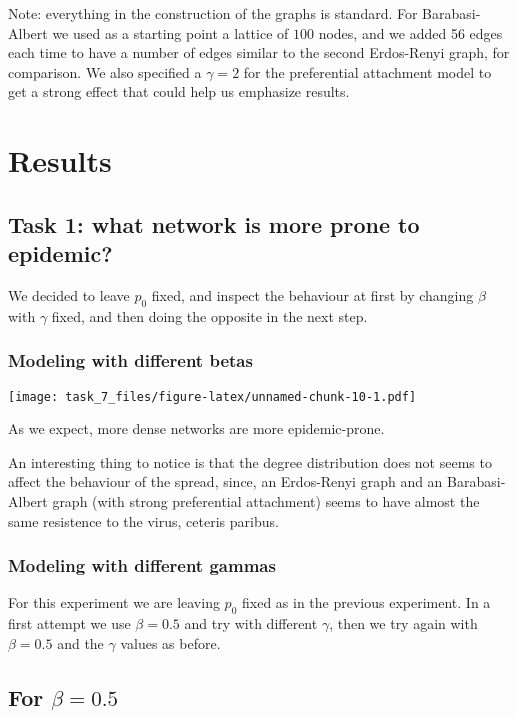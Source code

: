 \documentclass[]{article}
\begin{document}
Note: everything in the construction of the graphs is standard. For
Barabasi-Albert we used as a starting point a lattice of \(100\) nodes,
and we added 56 edges each time to have a number of edges similar to the
second Erdos-Renyi graph, for comparison. We also specified a
\(\gamma = 2\) for the preferential attachment model to get a strong
effect that could help us emphasize results.

\section{Results}\label{results}

\subsection{Task 1: what network is more prone to
epidemic?}\label{task-1-what-network-is-more-prone-to-epidemic}

We decided to leave \(p_0\) fixed, and inspect the behaviour at first by
changing \(\beta\) with \(\gamma\) fixed, and then doing the opposite in
the next step.

\subsubsection{Modeling with different
betas}\label{modeling-with-different-betas}

\texttt{[image: task\_7\_files/figure-latex/unnamed-chunk-10-1.pdf]}

As we expect, more dense networks are more epidemic-prone.

An interesting thing to notice is that the degree distribution does not
seems to affect the behaviour of the spread, since, an Erdos-Renyi graph
and an Barabasi-Albert graph (with strong preferential attachment) seems
to have almost the same resistence to the virus, ceteris paribus.

\subsubsection{Modeling with different
gammas}\label{modeling-with-different-gammas}

For this experiment we are leaving \(p_0\) fixed as in the previous
experiment. In a first attempt we use \(\beta = 0.5\) and try with
different \(\gamma\), then we try again with \(\beta = 0.5\) and the
\(\gamma\) values as before.

\subsection{\texorpdfstring{For
\(\beta = 0.5\)}{For \textbackslash{}beta = 0.5}}\label{for-beta-0.5}
\end{document}
